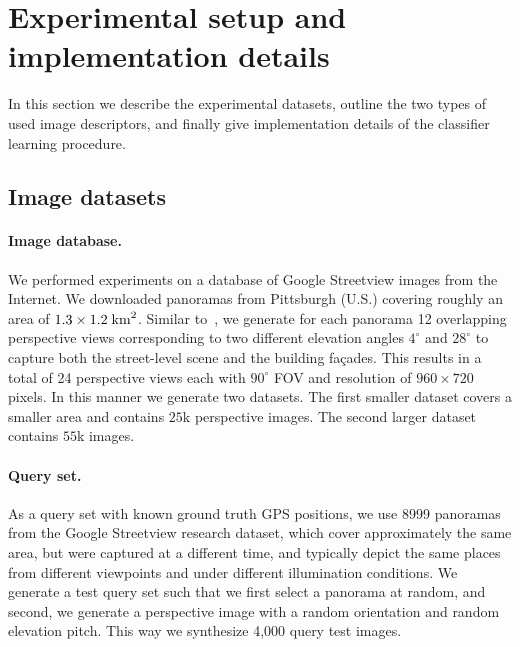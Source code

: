 \section{Experimental setup and implementation details}
\label{sec:experiments}
  In this section we describe the experimental datasets, outline the two types of used image descriptors, and finally give implementation details of the classifier learning procedure.
  

  \subsection{Image datasets}
    \paragraph{Image database.}
      We performed experiments on a database of Google Streetview images from the Internet. We downloaded panoramas from Pittsburgh (U.S.) covering roughly an area of $1.3 \times 1.2 \; {\rm km}^2$. Similar to~\cite{Chen11}, we generate for each panorama 12 overlapping perspective views corresponding to two different elevation angles $4^\circ$ and $28^\circ$ to capture both the street-level scene and the building fa\c{c}ades. This results in a total of 24 perspective views each with $90^\circ$ FOV and resolution of $960 \times 720$ pixels. In this manner we generate two datasets. The first smaller dataset covers a smaller area and contains $25$k perspective images.  The second larger dataset contains $55$k images.

      \paragraph{Query set.}
      As a query set with known ground truth GPS positions, we use 8999 panoramas from the Google Streetview research dataset, which cover approximately the same area, but were captured at a different time, and typically depict the same places from different viewpoints and under different illumination conditions.          
      We generate a test query set such that we first select a panorama at random, and second, we generate a perspective image with a random orientation and random elevation pitch. This way we synthesize 4,000 query test images. 

